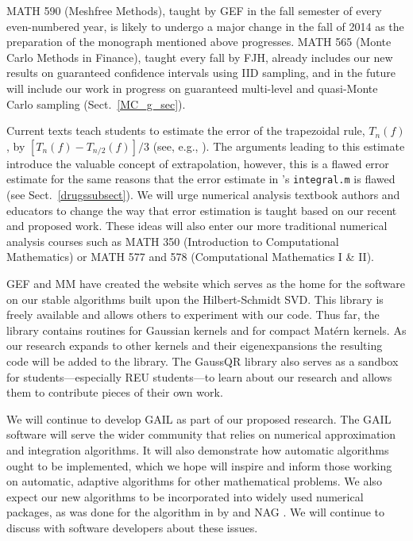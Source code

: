 \begin{description}[leftmargin=2.5ex]
\item[Refreshing Course Syllabi]
MATH 590 (Meshfree Methods), taught by GEF in the fall semester of every even-numbered year, is likely to undergo a major change in the fall of 2014 as the preparation of the monograph mentioned above progresses. MATH 565 (Monte Carlo Methods in Finance), taught every fall by FJH, already includes our new results on guaranteed confidence intervals using IID sampling, and in the future will include our work in progress on guaranteed multi-level and quasi-Monte Carlo sampling (Sect.\ \ref{MC_g_sec}).

\item[Changing How Numerical Analysis Is Taught] Current texts teach students to estimate the error of the trapezoidal rule, $T_n(f)$, by $[T_n(f)-T_{n/2}(f)]/3$ (see, e.g., \cite[p.\ 223--224]{BurFai10}).  The arguments leading to this estimate introduce the valuable concept of extrapolation, however, this is a flawed error estimate for the same reasons that the error estimate in \Matlab's {\tt integral.m} is flawed (see Sect.\ \ref{drugssubsect}).  We will urge numerical analysis textbook authors and educators to change the way that error estimation is taught based on our recent and proposed work.  These ideas will also enter our more traditional numerical analysis courses such as MATH 350 (Introduction to Computational Mathematics) or MATH 577 and 578 (Computational Mathematics I \& II).

\item[Creating Software and Collaborating with Software Developers]
GEF and MM have created the website \citep{McCFBG13} which serves as the home for the software on our stable algorithms built upon the Hilbert-Schmidt SVD. This \Matlab library is freely available and allows others to experiment with our code. Thus far, the library contains routines for Gaussian kernels and for compact Mat\'ern kernels. As our research expands to other kernels and their eigenexpansions the resulting code will be added to the library. The GaussQR library also serves as a sandbox for students---especially REU students---to learn about our research and allows them to contribute pieces of their own work.

We will continue to develop GAIL \citep{ChoiEtal13a} as part of our proposed research.  The GAIL software will serve the wider community that relies on numerical approximation and integration algorithms.  It will also demonstrate how automatic algorithms ought to be implemented, which we hope will inspire and inform those working on automatic, adaptive algorithms for other mathematical problems.  We also expect our new algorithms to be incorporated into widely used numerical packages, as was done for the algorithm in \cite{HonHic00a} by \Matlab \citep{MAT8.2} and NAG \citep{NAG23}.  We will continue to discuss with software developers about these issues.


\end{description}

